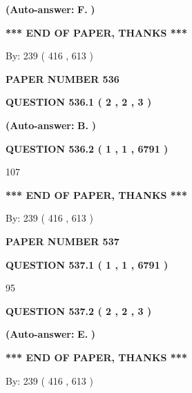 \documentclass{ctexart}
\begin{document}
 
{\textbf{(Auto-answer:}}
{\textbf{\large{
F.}}}
{\textbf{)}}
 
 
   
   
   
   
\vspace{1.0in} 
{\textbf{\large{ *** END OF PAPER, THANKS *** }}} 
   
   
\hspace{1.0in} By: 
 239 ( 416 ,  613 )
   
   
   
   
\newpage 
\setcounter{page}{ 
   536001 } 
   
   
 {\textbf{ \Large{ PAPER NUMBER  536  }}}
   
   
   
   
  
  
{\textbf{\large{QUESTION
536.1 
 ( 2 , 2 , 3 )
}}}
 
 
{\textbf{(Auto-answer:}}
{\textbf{\large{
B.}}}
{\textbf{)}}
 
 
  
  
{\textbf{\large{QUESTION
536.2 
 ( 1 , 1 , 6791 )
}}}

107
   
   
   
   
\vspace{1.0in} 
{\textbf{\large{ *** END OF PAPER, THANKS *** }}} 
   
   
\hspace{1.0in} By: 
 239 ( 416 ,  613 )
   
   
   
   
\newpage 
\setcounter{page}{ 
   537001 } 
   
   
 {\textbf{ \Large{ PAPER NUMBER  537  }}}
   
   
   
   
  
  
{\textbf{\large{QUESTION
537.1 
 ( 1 , 1 , 6791 )
}}}

95
  
  
{\textbf{\large{QUESTION
537.2 
 ( 2 , 2 , 3 )
}}}
 
 
{\textbf{(Auto-answer:}}
{\textbf{\large{
E.}}}
{\textbf{)}}
 
 
   
   
   
   
\vspace{1.0in} 
{\textbf{\large{ *** END OF PAPER, THANKS *** }}} 
   
   
\hspace{1.0in} By: 
 239 ( 416 ,  613 )
   
   
   
\end{document}
